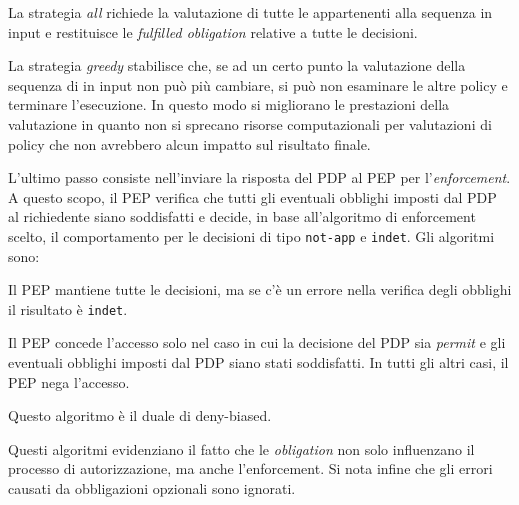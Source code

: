 \begin{description}[labelindent=5pt,style=multiline,leftmargin=3cm]
  \item[All]La strategia \emph{all} richiede la valutazione di tutte le \epolicy appartenenti alla sequenza in input e
            restituisce le \emph{fulfilled obligation} relative a tutte le decisioni.
  \item[Greedy]La strategia \emph{greedy} stabilisce che, se ad un certo punto la valutazione della sequenza di \epolicy
               in input non può più cambiare, si può non esaminare le altre policy e terminare l'esecuzione. In questo modo
               si migliorano le prestazioni della valutazione in quanto non si sprecano risorse computazionali
               per valutazioni di policy che non avrebbero alcun impatto sul risultato finale.
\end{description}\par
L'ultimo passo consiste nell'inviare la risposta del \ac{PDP} al \ac{PEP} per l'\emph{enforcement}. A questo scopo, il \ac{PEP} verifica
che tutti gli eventuali obblighi imposti dal \ac{PDP} al richiedente siano soddisfatti e decide, in base all'algoritmo di
enforcement scelto, il comportamento per le decisioni di tipo \texttt{not-app} e \texttt{indet}. Gli algoritmi sono:
\begin{description}[labelindent=5pt,style=multiline,leftmargin=4cm]
  \item[base]Il \ac{PEP} mantiene tutte le decisioni, ma se c'è un errore nella verifica degli obblighi il risultato è \texttt{indet}.
  \item[deny-biased]Il \ac{PEP} concede l'accesso solo nel caso in cui la decisione del \ac{PDP} sia \emph{permit} e gli eventuali obblighi imposti dal \ac{PDP} siano stati soddisfatti. In tutti gli altri casi, il \ac{PEP} nega l’accesso.
  \item[permit-biased]Questo algoritmo è il duale di deny-biased.
\end{description}
Questi algoritmi evidenziano il fatto che le \emph{obligation} non solo influenzano il processo di autorizzazione, ma anche l'enforcement.
Si nota infine che gli errori causati da obbligazioni opzionali sono ignorati.


